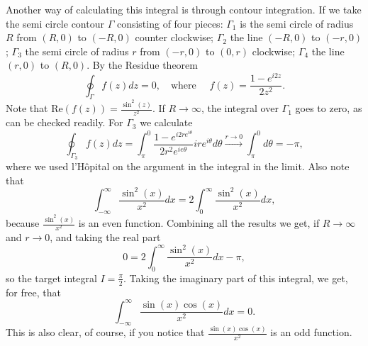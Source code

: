 Another way of calculating this integral is through contour integration.
If we take the semi circle contour $\Gamma$ consisting of four pieces: $\Gamma_1$ is the semi circle of radius $R$ from $(R, 0)$ to $(-R, 0)$ counter clockwise; $\Gamma_2$ the line $(-R, 0)$ to $(-r, 0)$; $\Gamma_3$ the semi circle of radius $r$ from $(-r, 0)$ to $(0, r)$ clockwise; $\Gamma_4$ the line $(r, 0)$ to $(R, 0)$.
By the Residue theorem
\begin{equation*}
    \oint_{\Gamma} f(z) dz = 0, \quad \text{where } \quad f(z) = \frac{1 - e^{i2z}}{2z^2}.
\end{equation*}
Note that $\mathrm{Re}(f(z)) = \frac{\sin^2(z)}{z^2}$.
If $R \to \infty$, the integral over $\Gamma_1$ goes to zero, as can be checked readily.
For $\Gamma_3$ we calculate
\begin{equation*}
    \oint_{\Gamma_3} f(z) dz
        = \int_{\pi}^{0} \frac{1 - e^{i2re^{i\theta}}}{2 r^2 e^{ie\theta}} ire^{i\theta} d\theta
        \xrightarrow{r \to 0} \int_{\pi}^0 d\theta
        = -\pi,
\end{equation*}
where we used l'H\^opital on the argument in the integral in the limit.
Also note that
\begin{equation*}
    \int_{-\infty}^{\infty} \frac{\sin^2(x)}{x^2} dx = 2 \int_0^{\infty} \frac{\sin^2(x)}{x^2} dx,
\end{equation*}
because $\frac{\sin^2(x)}{x^2}$ is an even function.
Combining all the results we get, if $R \to \infty$ and $r \to 0$, and taking the real part
\begin{equation*}
    0 = 2 \int_{0}^{\infty} \frac{\sin^2(x)}{x^2} dx - \pi,
\end{equation*}
so the target integral $I = \frac{\pi}{2}$.
Taking the imaginary part of this integral, we get, for free, that
\begin{equation*}
    \int_{-\infty}^{\infty} \frac{\sin(x)\cos(x)}{x^2} dx = 0.
\end{equation*}
This is also clear, of course, if you notice that $\frac{\sin(x)\cos(x)}{x^2}$ is an odd function.

